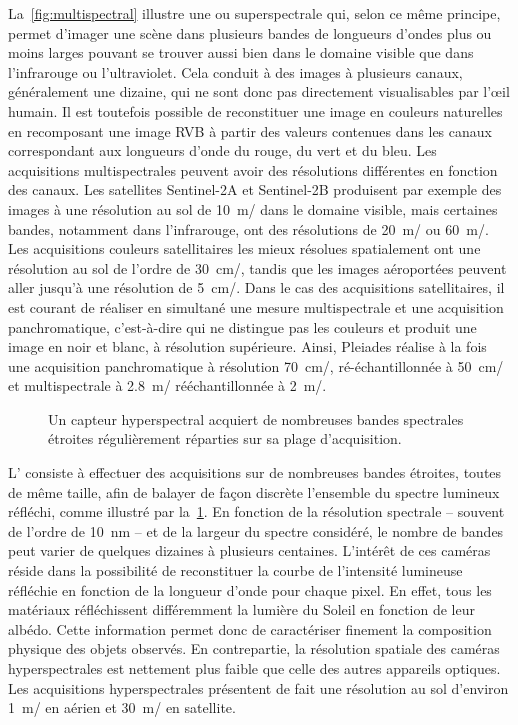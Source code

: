 La~\cref{fig:multispectral} illustre une  ou superspectrale qui, selon ce même principe, permet d'imager une scène dans plusieurs bandes de longueurs d'ondes plus ou moins larges pouvant se trouver aussi bien dans le domaine visible que dans l'infrarouge ou l'ultraviolet. Cela conduit à des images à plusieurs canaux, généralement une dizaine, qui ne sont donc pas directement visualisables par l'\oe{}il humain. Il est toutefois possible de reconstituer une image en couleurs naturelles en recomposant une image \gls{RVB} à partir des valeurs contenues dans les canaux correspondant aux longueurs d'onde du rouge, du vert et du bleu. Les acquisitions multispectrales peuvent avoir des résolutions différentes en fonction des canaux. Les satellites Sentinel-2A et Sentinel-2B produisent par exemple des images à une résolution au sol de \SI{10}{\meter/\px} dans le domaine visible, mais certaines bandes, notamment dans l'infrarouge, ont des résolutions de \SI{20}{\meter/\px} ou \SI{60}{\meter/\px}. Les acquisitions couleurs satellitaires les mieux résolues spatialement ont une résolution au sol de l'ordre de \SI{30}{\centi\meter/\px}, tandis que les images aéroportées peuvent aller jusqu'à une résolution de \SI{5}{\centi\meter/\px}. Dans le cas des acquisitions satellitaires, il est courant de réaliser en simultané une mesure multispectrale et une acquisition panchromatique, c'est-à-dire qui ne distingue pas les couleurs et produit une image en noir et blanc, à résolution supérieure. Ainsi, \gls{Pleiades} réalise à la fois une acquisition panchromatique à résolution \SI{70}{\centi\meter/\px}, ré-échantillonnée à \SI{50}{\centi\meter/\px} et multispectrale à \SI{2,8}{\meter/\px} rééchantillonnée à \SI{2}{\meter/\px}.

\begin{figure}
  \resizebox{\textwidth}{!}{
  
  }
  \caption{Un capteur hyperspectral acquiert de nombreuses bandes spectrales étroites régulièrement réparties sur sa plage d'acquisition.}
  \label{fig:hyperspectral}
\end{figure}

L' consiste à effectuer des acquisitions sur de nombreuses bandes étroites, toutes de même taille, afin de balayer de façon discrète l'ensemble du spectre lumineux réfléchi, comme illustré par la~\cref{fig:hyperspectral}. En fonction de la résolution spectrale -- souvent de l'ordre de \SI{10}{\nano\meter} -- et de la largeur du spectre considéré, le nombre de bandes peut varier de quelques dizaines à plusieurs centaines. L'intérêt de ces caméras réside dans la possibilité de reconstituer la courbe de l'intensité lumineuse réfléchie en fonction de la longueur d'onde pour chaque pixel. En effet, tous les matériaux réfléchissent différemment la lumière du Soleil en fonction de leur albédo. Cette information permet donc de caractériser finement la composition physique des objets observés. En contrepartie, la résolution spatiale des caméras hyperspectrales est nettement plus faible que celle des autres appareils optiques. Les acquisitions hyperspectrales présentent de fait une résolution au sol d'environ \SI{1}{\meter/\px} en aérien et \SI{30}{\meter/\px} en satellite.

